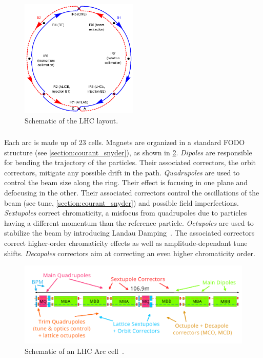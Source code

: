 \begin{figure}[!htb]
    \centering
    \includegraphics[width=0.5\textwidth]{./images/irs.png}
    \caption{Schematic of the LHC layout.}
    \label{fig:introduction:lhc_irs}
\end{figure}


\subsubsection{}

Each arc is made up of 23 cells. Magnets are organized in a standard FODO structure
(see \cref{section:courant_snyder}), as shown in \cref{fig:introduction:lhc_arc_cell}.
\textit{Dipoles} are responsible for bending the trajectory of the particles. Their associated
correctors, the orbit correctors, mitigate any possible drift in the path.
\textit{Quadrupoles} are used to control the beam size along the ring. Their effect is focusing in
one plane and defocusing in the other. Their associated correctors control the oscillations of the
beam (see tune, \cref{section:courant_snyder}) and possible field imperfections.
\textit{Sextupoles} correct chromaticity, a misfocus from quadrupoles due to particles having
a different momentum than the reference particle.
\textit{Octupoles} are used to stabilize the beam by introducing Landau
Damping~\cite{gareyte_landau_1997}. The associated correctors correct higher-order chromaticity
effects as well as amplitude-dependant tune shifts.
\textit{Decapoles} correctors aim at correcting an even higher chromaticity order.

\begin{figure}[H]
    \centering
    \includegraphics[width=1\textwidth]{./images/lhc_cell.png}
    \caption{Schematic of an LHC Arc cell~\cite{bruning_lhc_2004}.}
    \label{fig:introduction:lhc_arc_cell}
\end{figure}



